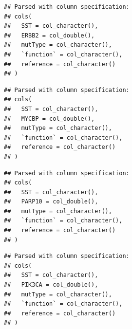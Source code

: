 \documentclass[]{article}
\newenvironment{Shaded}{\begin{snugshade}}{\end{snugshade}}
\newcommand{\CommentTok}[1]{\textcolor[rgb]{0.56,0.35,0.01}{\textit{#1}}}
\newcommand{\ControlFlowTok}[1]{\textcolor[rgb]{0.13,0.29,0.53}{\textbf{#1}}}
\newcommand{\KeywordTok}[1]{\textcolor[rgb]{0.13,0.29,0.53}{\textbf{#1}}}
\newcommand{\NormalTok}[1]{#1}
\newcommand{\OperatorTok}[1]{\textcolor[rgb]{0.81,0.36,0.00}{\textbf{#1}}}
\newcommand{\StringTok}[1]{\textcolor[rgb]{0.31,0.60,0.02}{#1}}
\begin{document}
\begin{verbatim}
## Parsed with column specification:
## cols(
##   SST = col_character(),
##   ERBB2 = col_double(),
##   mutType = col_character(),
##   `function` = col_character(),
##   reference = col_character()
## )
\end{verbatim}

\begin{verbatim}
## Parsed with column specification:
## cols(
##   SST = col_character(),
##   MYCBP = col_double(),
##   mutType = col_character(),
##   `function` = col_character(),
##   reference = col_character()
## )
\end{verbatim}

\begin{verbatim}
## Parsed with column specification:
## cols(
##   SST = col_character(),
##   PARP10 = col_double(),
##   mutType = col_character(),
##   `function` = col_character(),
##   reference = col_character()
## )
\end{verbatim}

\begin{verbatim}
## Parsed with column specification:
## cols(
##   SST = col_character(),
##   PIK3CA = col_double(),
##   mutType = col_character(),
##   `function` = col_character(),
##   reference = col_character()
## )
\end{verbatim}

\begin{Shaded}
\end{Shaded}
\end{document}
